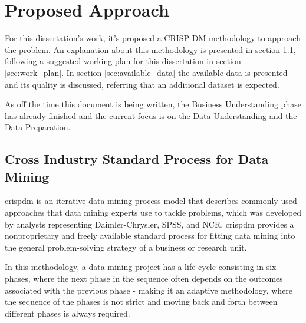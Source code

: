 \chapter{Proposed Approach}
\label{cha:available_data}

For this dissertation's work, it's proposed a CRISP-DM methodology to approach the problem. An explanation about this methodology is presented in section \ref{sec:crispdm}, following a suggested working plan for this dissertation in section \ref{sec:work_plan}. In section \ref{sec:available_data} the available data is presented and its quality is discussed, referring that an additional dataset is expected.

As off the time this document is being written, the Business Understanding phase has already finished and the current focus is on the Data Understanding and the Data Preparation.




\section{Cross Industry Standard Process for Data Mining} %
\label{sec:crispdm}

\Acrfull{crispdm} is an iterative data mining process model that describes commonly used approaches that data mining experts use to tackle problems, which was developed by analysts representing Daimler-Chrysler, SPSS, and NCR. \Acrshort{crispdm} provides a nonproprietary and freely available standard process for fitting data mining into the general problem-solving strategy of a business or research unit.

In this methodology, a data mining project has a life-cycle consisting in six phases, where the next phase in the sequence often depends on the outcomes associated with the previous phase - making it an adaptive methodology, where the sequence of the phases is not strict and moving back and forth between different phases is always required.

